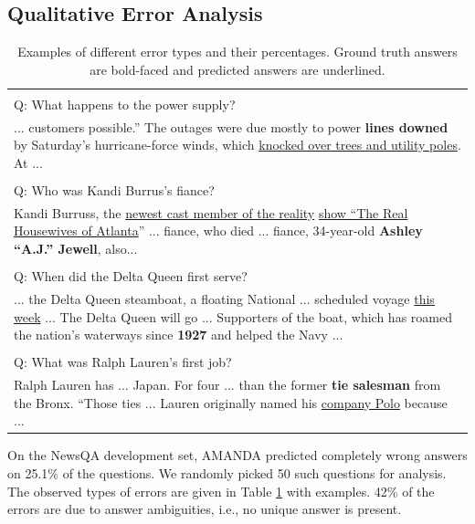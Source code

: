 \documentclass[letterpaper]{article} %
\begin{document}
\subsection{Qualitative Error Analysis}
\label{sec:qual_error_analysis}
\begin{table}[t]
\centering
\begin{tabular}{|p{8.0cm}|}
\hline
\noindent{Answer ambiguity (42\%)} \\
Q: What happens to the power supply? \\
... customers possible.'' The outages were due mostly to power \textbf{lines downed} by Saturday's hurricane-force winds, which \underline{knocked over trees and utility poles}. At  ... \\ \hline
\noindent{Context mismatch (22\%)} \\
Q: Who was Kandi Burrus's fiance? \\
Kandi Burruss, the \underline{newest cast member of the reality} \underline{show ``The Real Housewives of Atlanta}'' ... fiance, who died ... fiance, 34-year-old \textbf{Ashley ``A.J.'' Jewell}, also... \\
\hline
\noindent{Complex inference (10\%)} \\
Q: When did the Delta Queen first serve? \\
...  the Delta Queen steamboat, a floating National ... scheduled voyage \underline{this week} ... The Delta Queen will go ... Supporters of the boat, which has roamed the nation's waterways since \textbf{1927} and helped the Navy ... \\
\hline
\noindent{Paraphrasing issues (6\%)} \\
Q: What was Ralph Lauren's first job? \\
Ralph Lauren has ... Japan. For four ... than the former \textbf{tie salesman} from the Bronx. ``Those ties ... Lauren originally named his \underline{company Polo} because ... \\
\hline
\end{tabular}
\caption{Examples of different error types and their percentages. Ground truth answers are bold-faced and predicted answers are underlined.}
\label{tab:qual_analysis}
\end{table}
On the NewsQA development set, AMANDA predicted completely wrong answers on 25.1\% of the questions. We randomly picked 50 such questions for analysis. The observed types of errors are given in Table \ref{tab:qual_analysis} with examples. 42\% of the errors are due to answer ambiguities, i.e., no unique answer is present. 
\end{document}
